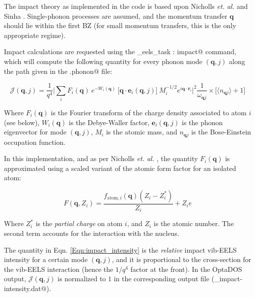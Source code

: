 \documentclass[a4paper,11pt,twoside]{book}
\begin{document}
{The impact theory as implemented in the \optados code is based upon Nicholls \textit{et. al.} \cite{Nicholls_et_al_2019} and Sinha \cite{Sinha_2001}. Single-phonon processes are assumed, and the momentum transfer $\mathbf{q}$ should lie within the first BZ (for small momentum transfers, this is the only appropriate regime).

Impact calculations are requested using the \verb@phonon_eels_task : impact@ command, which will compute the following quantity for every phonon mode $(\mathbf{q},j)$ along the path given in the \verb@.phonon@ file:

\begin{equation}
\mathcal{J}(\mathbf{q},j) = 
\frac{1}{q^4} \bigg| \sum_i F_{i}(\mathbf{q}) \ e^{-W_i(\mathbf{q})} \ \big[ \mathbf{q}\cdot \mathbf{e}_i(\mathbf{q},j) \big] \ M_i^{-1/2} e^{i\mathbf{q}\cdot\mathbf{r}_i}
\bigg|^2 \frac{1}{\omega_{\mathbf{q} j}} \times \bigg[ \langle n_{\mathbf{q} j} \rangle + 1 \bigg]
\label{Eqn:impact_intensity}
\end{equation}

Where $F_{i}(\mathbf{q})$ is the Fourier transform of the charge density associated to atom $i$ (see below), $W_{i}(\mathbf{q})$ is the Debye-Waller factor, $\mathbf{e}_i(\mathbf{q},j)$ is the phonon eigenvector for mode $(\mathbf{q},j)$, $M_{i}$ is the atomic mass, and $n_{\mathbf{q} j}$ is the Bose-Einstein occupation function.

In this implementation, and as per Nicholls \textit{et. al.} \cite{Nicholls_et_al_2019}, the quantity $F_{i}(\mathbf{q})$ is approximated using a scaled variant of the atomic form factor for an isolated atom:

\begin{equation}
F(\mathbf{q}, Z_i) = \frac{f_{\mathrm{atom},i}(\mathbf{q})\left(Z_i - Z_i^{*}\right)} {Z_i} + Z_i e
\end{equation}

Where $Z_i^{*}$ is the \textit{partial charge} on atom $i$, and $Z_{i}$ is the atomic number. The second term accounts for the interaction with the nucleus.

The quantity in Eqn. \ref{Eqn:impact_intensity} is the \textit{relative} impact vib-EELS intensity for a certain mode $(\mathbf{q},j)$, and it is proportional to the cross-section for the vib-EELS interaction (hence the $1/q^{4}$ factor at the front). In the OptaDOS output, $\mathcal{J}(\mathbf{q},j)$ is normalized to $1$ in the corresponding output file (\verb@seedname_impact-intensity.dat@).

}
\end{document}
